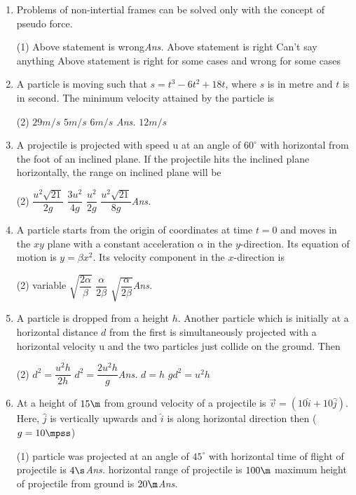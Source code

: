 \documentclass{article}
\newcommand{\ans}{\textcolor{red!95}{\textit{\quad Ans.}}}
\begin{document}
\begin{enumerate}
\item Problems of non-intertial frames can be solved only with the concept of pseudo force.
\begin{tasks}(1)
	\task Above statement is wrong\ans
	\task Above statement is right
	\task Can't say anything
	\task Above statement is right for some cases and wrong for some cases
\end{tasks}
	

\item A particle is moving such that $s=t^3-6t^2+18t$, where $s$ is in metre and $t$ is in second. The minimum velocity attained by the particle is
\begin{tasks}(2)
	\task $29 m/s$
	\task $5 m/s$
    \task $6 m/s$ \ans
    \task $12 m/s$
\end{tasks}

\item A projectile is projected with speed u at an angle of $60^\circ$ with horizontal from the foot of an inclined plane. If the projectile hits the inclined plane horizontally, the range on inclined plane will be
\begin{tasks}(2)
	\task $\dfrac{u^2\sqrt{21}}{2g}$
	\task $\dfrac{3u^2}{4g}$
	\task $\dfrac{u^2}{2g}$
	\task $\dfrac{u^2\sqrt{21}}{8g}$\ans
\end{tasks}
            
            
\item A particle starts from the origin of coordinates at time $t = 0$ and moves in the $xy$ plane with a constant acceleration $\alpha$ in the $y$-direction. Its equation of motion is $y = \beta x^2$. Its velocity
component in the $x$-direction is  
\begin{tasks}(2)
	\task variable
	\task $\sqrt{\dfrac{2\alpha}{\beta}}$
	\task $\dfrac{\alpha}{2\beta}$
	\task $\sqrt{\dfrac{\alpha}{2\beta}}$\ans
\end{tasks}          
         
\item A particle is dropped from a height $h$. Another particle which is initially at a horizontal distance $d$ from the first is simultaneously projected with a horizontal velocity u and the two particles just collide on the ground. Then   
\begin{tasks}(2)
	\task $d^2=\dfrac{u^2h}{2h}$
	\task $d^2=\dfrac{2u^2h}{g}$\ans
	\task $d=h$
	\task $gd^2=u^2h$
\end{tasks}
            
            
\item At a height of $15 \m$ from ground velocity of a projectile is $\vec{v} = (10 \hat{i} + 10\hat{j})$. Here, $\hat{j}$ is vertically upwards and $\hat{i}$ is along horizontal direction then ($g = 10 \mpss$)
\begin{tasks}(1)
	\task particle was projected at an angle of $45^\circ$ with horizontal
	\task time of flight of projectile is $4 \s$\ans
	\task horizontal range of projectile is $100 \m$
	\task maximum height of projectile from ground is $20 \m$\ans
\end{tasks}


\end{enumerate}
\end{document}
